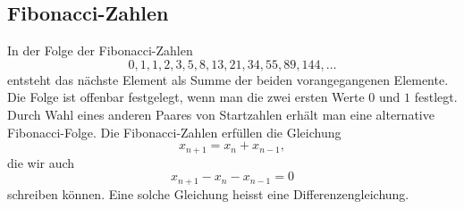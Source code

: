 \subsection{Fibonacci-Zahlen}
In der Folge der Fibonacci-Zahlen
\[
0,1,1,2,3,5,8,13,21,34,55,89,144,\dots
\]
entsteht das nächste Element als Summe der beiden vorangegangenen
Elemente.
Die Folge ist offenbar festgelegt, wenn man die zwei ersten
Werte $0$ und $1$ festlegt.
Durch Wahl eines anderen Paares von Startzahlen
erhält man eine alternative Fibonacci-Folge.
Die Fibonacci-Zahlen
erfüllen die Gleichung 
\[
x_{n+1}=x_n+x_{n-1},
\]
die wir
auch 
\begin{equation}
x_{n+1}-x_n-x_{n-1}=0
\end{equation}
schreiben können.
Eine solche Gleichung heisst eine Differenzengleichung.

